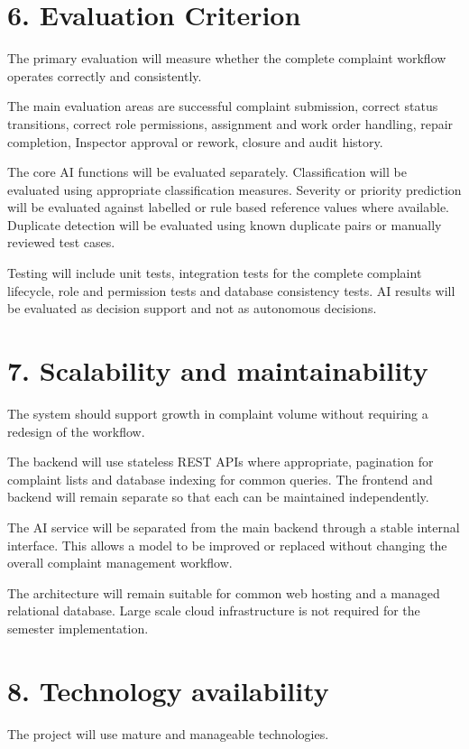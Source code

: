 \documentclass[12pt,a4paper]{article}
\begin{document}
\section{6. Evaluation Criterion}
The primary evaluation will measure whether the complete complaint workflow operates correctly and consistently.

The main evaluation areas are successful complaint submission, correct status transitions, correct role permissions, assignment and work order handling, repair completion, Inspector approval or rework, closure and audit history.

The core AI functions will be evaluated separately. Classification will be evaluated using appropriate classification measures. Severity or priority prediction will be evaluated against labelled or rule based reference values where available. Duplicate detection will be evaluated using known duplicate pairs or manually reviewed test cases.

Testing will include unit tests, integration tests for the complete complaint lifecycle, role and permission tests and database consistency tests. AI results will be evaluated as decision support and not as autonomous decisions.

\section{7. Scalability and maintainability}
The system should support growth in complaint volume without requiring a redesign of the workflow.

The backend will use stateless REST APIs where appropriate, pagination for complaint lists and database indexing for common queries. The frontend and backend will remain separate so that each can be maintained independently.

The AI service will be separated from the main backend through a stable internal interface. This allows a model to be improved or replaced without changing the overall complaint management workflow.

The architecture will remain suitable for common web hosting and a managed relational database. Large scale cloud infrastructure is not required for the semester implementation.

\section{8. Technology availability}
The project will use mature and manageable technologies.
\end{document}
